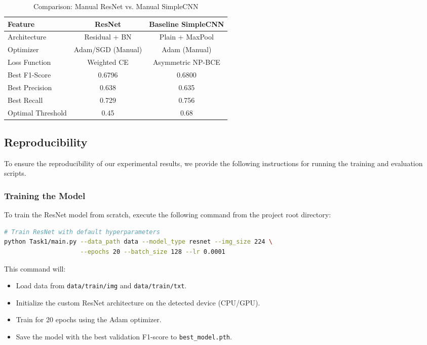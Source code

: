 \begin{table}[htbp]
\centering
\caption{Comparison: Manual ResNet vs. Manual SimpleCNN}
\label{tab:comparison}
\begin{tabular}{lcc}
\hline
\textbf{Feature} & \textbf{ResNet} & \textbf{Baseline SimpleCNN} \\
\hline
Architecture     & Residual + BN      & Plain + MaxPool \\
Optimizer        & Adam/SGD (Manual)  & Adam (Manual) \\
Loss Function    & Weighted CE        & Asymmetric NP-BCE \\
Best F1-Score    & 0.6796             & 0.6800 \\
Best Precision   & 0.638              & 0.635 \\
Best Recall      & 0.729              & 0.756 \\
Optimal Threshold & 0.45              & 0.68 \\
\hline
\end{tabular}
\end{table}

\subsection{Reproducibility}
To ensure the reproducibility of our experimental results, we provide the following instructions for running the training and evaluation scripts.

\subsubsection{Training the Model}
To train the ResNet model from scratch, execute the following command from the project root directory:
\begin{lstlisting}[language=bash]
# Train ResNet with default hyperparameters
python Task1/main.py --data_path data --model_type resnet --img_size 224 \
                     --epochs 20 --batch_size 128 --lr 0.0001
\end{lstlisting}
This command will:
\begin{itemize}
    \item Load data from \texttt{data/train/img} and \texttt{data/train/txt}.
    \item Initialize the custom ResNet architecture on the detected device (CPU/GPU).
    \item Train for 20 epochs using the Adam optimizer.
    \item Save the model with the best validation F1-score to \texttt{best\_model.pth}.
\end{itemize}


